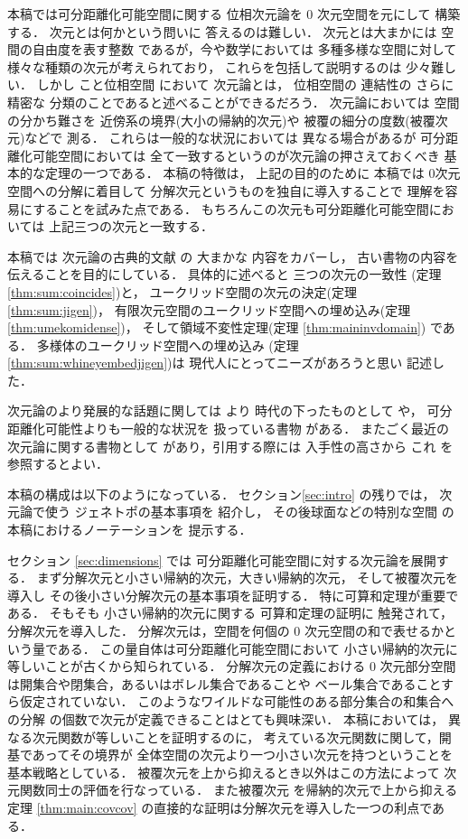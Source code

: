 \documentclass[leqno, a4paper, 12pt]{jsarticle}
\theoremstyle{plain}
\theoremstyle{definition}
\theoremstyle{remark}
\numberwithin{equation}{section}
\begin{document}
本稿では可分距離化可能空間に関する
位相次元論を
$0$
次元空間を元にして
構築する．
次元とは何かという問いに
答えるのは難しい．
次元とは大まかには
空間の自由度を表す整数
であるが，今や数学においては
多種多様な空間に対して
様々な種類の次元が考えられており，
これらを包括して説明するのは
少々難しい．
しかし
こと位相空間
において
次元論とは，
位相空間の
連結性の
さらに精密な
分類のことであると述べることができるだろう．
次元論においては
空間の分かち難さを
近傍系の境界(大小の帰納的次元)や
被覆の細分の度数(被覆次元)などで
測る．
これらは一般的な状況においては
異なる場合があるが
可分距離化可能空間においては
全て一致するというのが次元論の押さえておくべき
基本的な定理の一つである．
本稿の特徴は，
上記の目的のために
本稿では
0次元空間への分解に着目して
分解次元というものを独自に導入することで
理解を容易にすることを試みた点である．
もちろんこの次元も可分距離化可能空間においては
上記三つの次元と一致する．

本稿では
次元論の古典的文献
\cite{zbMATH02505166}
の
大まかな
内容をカバーし，
古い書物の内容を
伝えることを目的にしている．
具体的に述べると
三つの次元の一致性
(定理
\ref{thm:sum:coincides})と，
ユークリッド空間の次元の決定(定理
\ref{thm:sum:jigen})，
有限次元空間のユークリッド空間への埋め込み(定理
\ref{thm:umekomidense})，
そして領域不変性定理(定理
\ref{thm:maininvdomain})
である．
多様体のユークリッド空間への埋め込み
(定理
\ref{thm:sum:whineyembedjigen})は
現代人にとってニーズがあろうと思い
記述した．

次元論のより発展的な話題に関しては
より
時代の下ったものとして
\cite{zbMATH00815279}
や，
可分距離化可能性よりも一般的な状況を
扱っている書物
\cite{zbMATH03488230}
がある．
またごく最近の
次元論に関する書物として
\cite{zbMATH07075997}
があり，引用する際には
入手性の高さから
これ
を参照するとよい．


本稿の構成は以下のようになっている．
セクション\ref{sec:intro}
の残りでは，
次元論で使う
ジェネトポの基本事項を
紹介し，
その後球面などの特別な空間
の本稿におけるノーテーションを
提示する．

セクション
\ref{sec:dimensions}
では
可分距離化可能空間に対する次元論を展開する．
まず分解次元と小さい帰納的次元，大きい帰納的次元，
そして被覆次元を導入し
その後小さい分解次元の基本事項を証明する．
特に可算和定理が重要である．
そもそも
小さい帰納的次元に関する
可算和定理の証明に
触発されて，
分解次元を導入した．
分解次元は，空間を何個の
$0$
次元空間の和で表せるかという量である．
この量自体は可分距離化可能空間において
小さい帰納的次元に等しいことが古くから知られている．
分解次元の定義における
$0$
次元部分空間
は開集合や閉集合，あるいはボレル集合であることや
ベール集合であることすら仮定されていない．
このようなワイルドな可能性のある部分集合の和集合への分解
の個数で次元が定義できることはとても興味深い．
本稿においては，
異なる次元関数が等しいことを証明するのに，
考えている次元関数に関して，開基であってその境界が
全体空間の次元より一つ小さい次元を持つということを
基本戦略としている．
被覆次元を上から抑えるとき以外はこの方法によって
次元関数同士の評価を行なっている．
また被覆次元
を帰納的次元で上から抑える
定理
\ref{thm:main:covcov}
の直接的な証明は分解次元を導入した一つの利点である．
\end{document}
